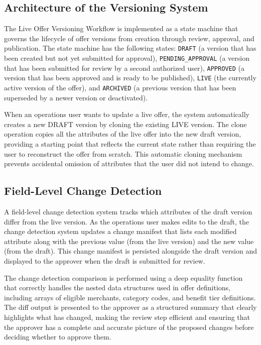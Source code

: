 \subsection{Architecture of the Versioning System}

The Live Offer Versioning Workflow is implemented as a state machine that governs the lifecycle of offer versions from creation through review, approval, and publication. The state machine has the following states: \texttt{DRAFT} (a version that has been created but not yet submitted for approval), \texttt{PENDING\_APPROVAL} (a version that has been submitted for review by a second authorized user), \texttt{APPROVED} (a version that has been approved and is ready to be published), \texttt{LIVE} (the currently active version of the offer), and \texttt{ARCHIVED} (a previous version that has been superseded by a newer version or deactivated).

When an operations user wants to update a live offer, the system automatically creates a new DRAFT version by cloning the existing LIVE version. The clone operation copies all the attributes of the live offer into the new draft version, providing a starting point that reflects the current state rather than requiring the user to reconstruct the offer from scratch. This automatic cloning mechanism prevents accidental omission of attributes that the user did not intend to change.

\subsection{Field-Level Change Detection}

A field-level change detection system tracks which attributes of the draft version differ from the live version. As the operations user makes edits to the draft, the change detection system updates a change manifest that lists each modified attribute along with the previous value (from the live version) and the new value (from the draft). This change manifest is persisted alongside the draft version and displayed to the approver when the draft is submitted for review.

The change detection comparison is performed using a deep equality function that correctly handles the nested data structures used in offer definitions, including arrays of eligible merchants, category codes, and benefit tier definitions. The diff output is presented to the approver as a structured summary that clearly highlights what has changed, making the review step efficient and ensuring that the approver has a complete and accurate picture of the proposed changes before deciding whether to approve them.

